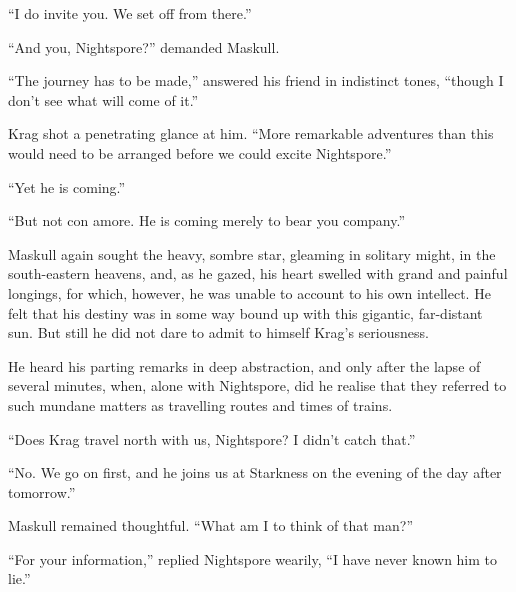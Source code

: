 ``I do invite you. We set off from there.''

``And you, Nightspore?'' demanded Maskull.

``The journey has to be made,'' answered his friend in indistinct tones, ``though I don't see what will come of it.''

Krag shot a penetrating glance at him. ``More remarkable adventures than this would need to be arranged before we could excite Nightspore.''

``Yet he is coming.''

``But not con amore. He is coming merely to bear you company.''

Maskull again sought the heavy, sombre star, gleaming in solitary might, in the south-eastern heavens, and, as he gazed, his heart swelled with grand and painful longings, for which, however, he was unable to account to his own intellect. He felt that his destiny was in some way bound up with this gigantic, far-distant sun. But still he did not dare to admit to himself Krag's seriousness.

He heard his parting remarks in deep abstraction, and only after the lapse of several minutes, when, alone with Nightspore, did he realise that they referred to such mundane matters as travelling routes and times of trains.

``Does Krag travel north with us, Nightspore? I didn't catch that.''

``No. We go on first, and he joins us at Starkness on the evening of the day after tomorrow.''

Maskull remained thoughtful. ``What am I to think of that man?''

``For your information,'' replied Nightspore wearily, ``I have never known him to lie.''



\chapterend